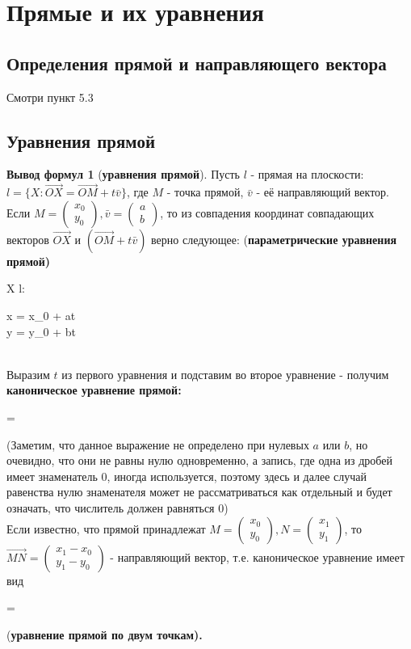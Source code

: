 \documentclass[a4paper, 12pt]{article}
\theoremstyle{definition}
\newtheorem*{formulas}{Вывод формул}
\newenvironment{boxedalign*}
  {\begin{equation*}\begin{lrbox}{\boxedalignbox}$\begin{aligned}}
  {\end{aligned}$\end{lrbox}\fbox{\usebox{\boxedalignbox}}\end{equation*}}
\begin{document}
	\section{Прямые и их уравнения}
	\subsection{Определения прямой и направляющего вектора}
	Смотри пункт 5.3
	\subsection{Уравнения прямой}
	\begin{formulas}[\bfseries уравнения прямой\mdseries]
		Пусть $l$ - прямая на плоскости: $l = \{X: \overrightarrow{OX} = \overrightarrow{OM} + t\bar{v}\}$, где $M$ - точка прямой, $\bar{v}$ - её направляющий вектор. Если $M=\begin{pmatrix}x_{0}\\y_{0}\end{pmatrix},\bar{v}=\begin{pmatrix}a\\b\end{pmatrix}$, то из совпадения координат совпадающих векторов $\overrightarrow{OX}$ и $(\overrightarrow{OM}+t\bar{v})$ верно следующее: (\bfseries параметрические уравнения прямой\mdseries) \begin{boxedalign*}X \in l: \begin{cases}x = x_{0} + at \\ y = y_{0} + bt\end{cases}\end{boxedalign*}\\
		Выразим $t$ из первого уравнения и подставим во второе уравнение - получим \bfseries каноническое уравнение прямой\mdseries : \begin{boxedalign*} = \end{boxedalign*}
		(Заметим, что данное выражение не определено при нулевых $a$ или $b$, но очевидно, что они не равны нулю одновременно, а запись, где одна из дробей имеет знаменатель 0, иногда используется, поэтому здесь и далее случай равенства нулю знаменателя может не рассматриваться как отдельный и будет означать, что числитель должен равняться 0)\\
		Если известно, что прямой принадлежат $M = \begin{pmatrix}x_{0}\\y_{0}\end{pmatrix}, N = \begin{pmatrix}x_{1}\\y_{1}\end{pmatrix}$, то $\overrightarrow{MN} = \begin{pmatrix}x_{1} - x_{0}\\y_{1} - y_{0}\end{pmatrix}$ - направляющий вектор, т.е. каноническое уравнение имеет вид \begin{boxedalign*} = \end{boxedalign*}(\bfseries уравнение прямой по двум точкам\mdseries).\\

\end{formulas}
\end{document}

